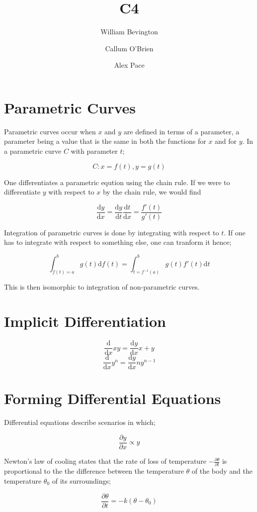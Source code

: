 \documentclass{article}
\title{C4}
\author{William Bevington \and Callum O'Brien \and Alex Pace}
\begin{document}
\maketitle
\tableofcontents
\newpage

\section{Parametric Curves}

Parametric curves occur when \(x\) and \(y\) are defined in terms of a parameter, a parameter being a value that is the same in both the functions for \(x\) and for \(y\). In a parametric curve \(C\) with parameter \(t\);

\[C:x=f(t),y=g(t)\]

\noindent One differentiates a parametric eqution using the chain rule. If we were to differentiate \(y\) with respect to \(x\) by the chain rule, we would find

\[\frac{\textrm{d}y}{\textrm{d}x}=\frac{\textrm{d}y}{\textrm{d}t}\frac{\textrm{d}t}{\textrm{d}x}=\frac{f'(t)}{g'(t)}\]

\noindent Integration of parametric curves is done by integrating with respect to \(t\). If one has to integrate with respect to something else, one can tranform it hence;

\[\int_{f(t)=a}^{b}g(t)\textrm{d}f(t)=\int_{t=f^{-1}(a)}^{b}g(t)f'(t)\textrm{d}t\]

\noindent This is then isomorphic to integration of non-parametric curves.

\section{Implicit Differentiation}

\[\frac{\textrm{d}}{\textrm{d}x}xy=\frac{\textrm{d}y}{\textrm{d}x}x+y\]
\[\frac{\textrm{d}}{\textrm{d}x}y^n=\frac{\textrm{d}y}{\textrm{d}x}ny^{n-1}\]

\section{Forming Differential Equations}

Differential equations describe scenarios in which;

\[\frac{\partial y}{\partial x}\propto y\]

\noindent Newton's law of cooling states that the rate of loss of temperature $-\frac{\partial\theta}{\partial t}$ is proportional to the the difference between the temperature $\theta$ of the body and the temperature $\theta_0$ of its surroundings;

\[\frac{\partial\theta}{\partial t}=-k(\theta-\theta_0)\]
\end{document}
